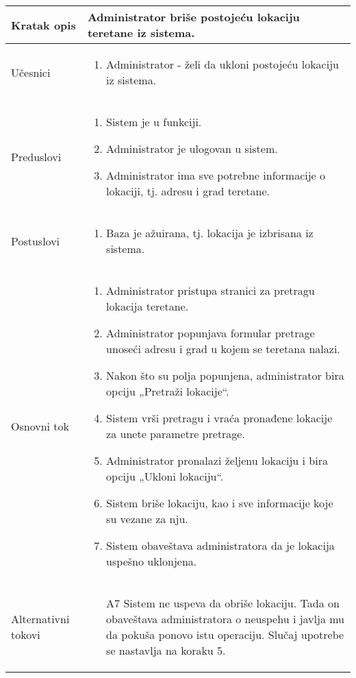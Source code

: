 \documentclass[../main.tex]{subfiles}
\begin{document}
\begin{longtable}{| p{} | p{} |} 

\hline
    Kratak opis &  Administrator briše postojeću lokaciju teretane iz sistema.\\ 
\hline    
    Učesnici & 
    	\begin{enumerate}
        \item Administrator - želi da ukloni postojeću lokaciju iz sistema.
     \end{enumerate}\\
\hline
   Preduslovi & \begin{enumerate}
       \item Sistem je u funkciji.
       \item Administrator je ulogovan u sistem.
       \item Administrator ima sve potrebne informacije o lokaciji, tj. adresu i grad teretane.
   \end{enumerate}\\
\hline  
    Postuslovi & \begin{enumerate}
        \item Baza je ažuirana, tj. lokacija je izbrisana iz sistema.
    \end{enumerate}\\
\hline
    Osnovni tok & \begin{enumerate}
        \item Administrator pristupa stranici za pretragu lokacija teretane.
        \item Administrator popunjava formular pretrage unoseći adresu i grad u kojem se teretana nalazi.
        \item Nakon što su polja popunjena, administrator bira opciju „Pretraži lokacije“.
        \item Sistem vrši pretragu i vraća pronađene lokacije za unete parametre pretrage.
        \item Administrator pronalazi željenu lokaciju i bira opciju „Ukloni lokaciju“.
        \item Sistem briše lokaciju, kao i sve informacije koje su vezane za nju.
        \item Sistem obaveštava administratora da je lokacija uspešno uklonjena.
    \end{enumerate}\\
\hline
    Alternativni tokovi & \begin{itemize}
        \item[A7]  Sistem ne uspeva da obriše lokaciju. Tada on obaveštava administratora o neuspehu i javlja mu da pokuša ponovo istu operaciju. Slučaj upotrebe se nastavlja na koraku 5.


\end{itemize}
\end{longtable}
\end{document}
